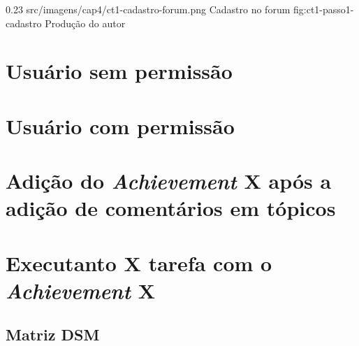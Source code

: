 \begin{image}
{0.23}
{src/imagens/cap4/ct1-cadastro-forum.png}
{Cadastro no forum}
{fig:ct1-passo1-cadastro}
{Produção do autor}
\end{image}

\section{Usuário sem permissão}

\section{Usuário com permissão}

\section{Adição do \textit{Achievement} X após a adição de comentários em tópicos}

\section{Executanto X tarefa com o \textit{Achievement} X}

\subsection{Matriz DSM}